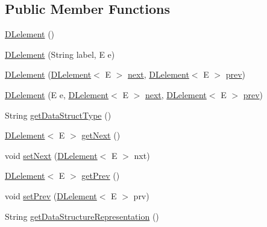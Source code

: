 \subsection*{Public Member Functions}
\begin{DoxyCompactItemize}
\item 
\hyperlink{classbridges_1_1base_1_1_d_lelement_a525b572340e161d9c430baff10b64ab2}{D\+Lelement} ()
\item 
\hyperlink{classbridges_1_1base_1_1_d_lelement_a6aa1d4a3dad4a196c2ed079d108562bc}{D\+Lelement} (String label, E e)
\item 
\hyperlink{classbridges_1_1base_1_1_d_lelement_ab1e4eace66bb1b097463c4f04e964cd0}{D\+Lelement} (\hyperlink{classbridges_1_1base_1_1_d_lelement}{D\+Lelement}$<$ E $>$ \hyperlink{classbridges_1_1base_1_1_s_lelement_abf61c96a74ad319d561c6952ea388e0e}{next}, \hyperlink{classbridges_1_1base_1_1_d_lelement}{D\+Lelement}$<$ E $>$ \hyperlink{classbridges_1_1base_1_1_d_lelement_a6eba4876f820b75ac6bde01d7dea9da7}{prev})
\item 
\hyperlink{classbridges_1_1base_1_1_d_lelement_a3ffba30204a2ea6939b07b0ded123af5}{D\+Lelement} (E e, \hyperlink{classbridges_1_1base_1_1_d_lelement}{D\+Lelement}$<$ E $>$ \hyperlink{classbridges_1_1base_1_1_s_lelement_abf61c96a74ad319d561c6952ea388e0e}{next}, \hyperlink{classbridges_1_1base_1_1_d_lelement}{D\+Lelement}$<$ E $>$ \hyperlink{classbridges_1_1base_1_1_d_lelement_a6eba4876f820b75ac6bde01d7dea9da7}{prev})
\item 
String \hyperlink{classbridges_1_1base_1_1_d_lelement_a4a0e8f7bd377a652927a741e70aae6d3}{get\+Data\+Struct\+Type} ()
\item 
\hyperlink{classbridges_1_1base_1_1_d_lelement}{D\+Lelement}$<$ E $>$ \hyperlink{classbridges_1_1base_1_1_d_lelement_a35e88e8d991d6f23ec63b3ef3f6cce4e}{get\+Next} ()
\item 
void \hyperlink{classbridges_1_1base_1_1_d_lelement_aa18aff21854e4fe372dfefef04b325fe}{set\+Next} (\hyperlink{classbridges_1_1base_1_1_d_lelement}{D\+Lelement}$<$ E $>$ nxt)
\item 
\hyperlink{classbridges_1_1base_1_1_d_lelement}{D\+Lelement}$<$ E $>$ \hyperlink{classbridges_1_1base_1_1_d_lelement_a859f08f38513ecdfff0eb11bd2b98ce7}{get\+Prev} ()
\item 
void \hyperlink{classbridges_1_1base_1_1_d_lelement_a152a06add922290d48b2d4affc87d592}{set\+Prev} (\hyperlink{classbridges_1_1base_1_1_d_lelement}{D\+Lelement}$<$ E $>$ prv)
\item 
String \hyperlink{classbridges_1_1base_1_1_d_lelement_aefe2e582992a9e574d733f109add80f2}{get\+Data\+Structure\+Representation} ()
\end{DoxyCompactItemize}
